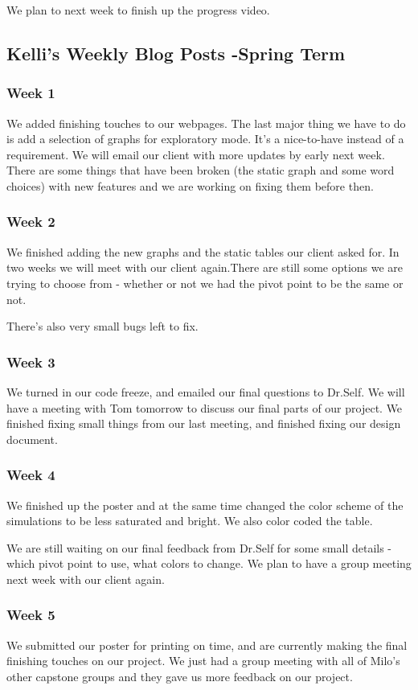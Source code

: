 We plan to next week to finish up the progress video. 

\subsection{Kelli's Weekly Blog Posts -Spring Term}
\subsubsection{Week 1}
We added finishing touches to our webpages. The last major thing we have to do is add a selection of graphs for exploratory mode. It's a nice-to-have instead of a requirement. We will email our client with more updates by early next week. There are some things that have been broken (the static graph and some word choices) with new features and we are working on fixing them before then. 
\subsubsection{Week 2}
We finished adding the new graphs and the static tables our client asked for. In two weeks we will meet with our client again.There are still some options we are trying to choose from - whether or not we had the pivot point to be the same or not. 

There's also very small bugs left to fix. 
\subsubsection{Week 3}
We turned in our code freeze, and emailed our final questions to Dr.Self. We will have a meeting with Tom tomorrow to discuss our final parts of our project. We finished fixing small things from our last meeting, and finished fixing our design document. 
\subsubsection{Week 4}
We finished up the poster and at the same time changed the color scheme of the simulations to be less saturated and bright. We also color coded the table. 

We are still waiting on our final feedback from Dr.Self for some small details - which pivot point to use, what colors to change. We plan to have a group meeting next week with our client again. 
\subsubsection{Week 5}
We submitted our poster for printing on time, and are currently making the final finishing touches on our project. We just had a group meeting with all of Milo's other capstone groups and they gave us more feedback on our project.

